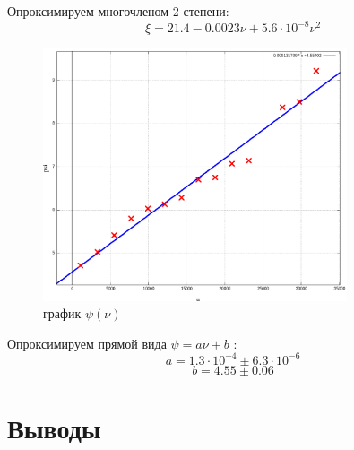 \documentclass{article}
\begin{document}
Опроксимируем многочленом 2 степени:
\[ \xi = 21.4 - 0.0023\nu + 5.6\cdot 10^{-8}\nu^2 \]

\begin{figure}[H]
    \centering
    \includegraphics[width=0.8\textwidth]{5.png}
    \caption{график \( \psi(\nu) \)}
\end{figure}

Опроксимируем прямой вида \( \psi = a\nu + b \) :
\[ a = 1.3\cdot 10^{-4} \pm 6.3\cdot 10^{-6} \]
\[ b = 4.55 \pm 0.06 \]


\section{Выводы}
\end{document}

